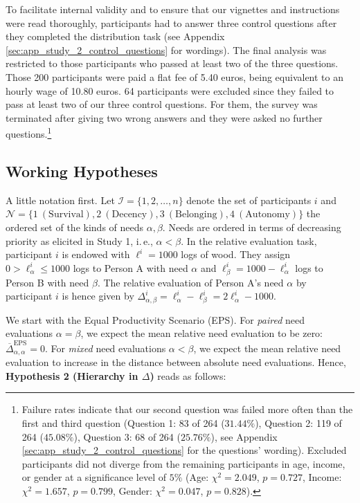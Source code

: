 \documentclass[egregdoesnotlikesansseriftitles]{scrartcl}
\begin{document}
To facilitate internal validity and to ensure that our vignettes and instructions were read thoroughly, participants had to answer three control questions after they completed the distribution task (see Appendix \ref{sec:app_study_2_control_questions} for wordings).
The final analysis was restricted to those participants who passed at least two of the three questions.
Those 200 participants were paid a flat fee of 5.40 euros, being equivalent to an hourly wage of 10.80 euros.
64 participants were excluded since they failed to pass at least two of our three control questions.
For them, the survey was terminated after giving two wrong answers and they were asked no further questions.\footnote{Failure rates indicate that our second question was failed more often than the first and third question (Question 1: 83 of 264 ($31.44\%$), Question 2: 119 of 264 ($45.08\%$), Question 3: 68 of 264 ($25.76\%$), see Appendix \ref{sec:app_study_2_control_questions} for the questions' wording).
Excluded participants did not diverge from the remaining participants in age, income, or gender at a significance level of $5\%$ (Age: $\chi^2=2.049$, $p=0.727$, Income: $\chi^2=1.657$, $p=0.799$, Gender: $\chi^2=0.047$, $p=0.828$).}


\subsection{Working Hypotheses}
A little notation first.
Let $\mathcal{I}=\{1,2,\ldots,n\}$ denote the set of participants $i$ and $\mathcal{N}=\{1\ (\text{Survival}), 2\ (\text{Decency}), 3\ (\text{Belonging}), 4\ (\text{Autonomy})\}$ the ordered set of the kinds of needs $\alpha, \beta$.
Needs are ordered in terms of decreasing priority as elicited in Study 1, i.\,e., $\alpha<\beta$.
In the relative evaluation task, participant $i$ is endowed with $\ell^i=1000$ logs of wood.
They assign $0 > \ell^i_\alpha\le 1000$ logs to Person A with need $\alpha$ and $\ell^i_\beta=1000-\ell^i_\alpha$ logs to Person B with need $\beta$.
The relative evaluation of Person A's need $\alpha$ by participant $i$ is hence given by $\Delta^i_{\alpha,\beta}=\ell^i_\alpha-\ell^i_\beta=2\ell^i_\alpha-1000$.

We start with the Equal Productivity Scenario (EPS).
For \textit{paired} need evaluations $\alpha=\beta$, we expect the mean relative need evaluation to be zero: $\overline{\Delta}^\text{EPS}_{\alpha,\alpha}=0$.
For \textit{mixed} need evaluations $\alpha<\beta$, we expect the mean relative need evaluation to increase in the distance between absolute need evaluations.
Hence, \textbf{Hypothesis 2 (Hierarchy in $\Delta$)} reads as follows:
\end{document}
